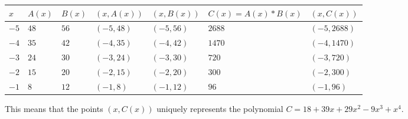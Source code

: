 \documentclass[11pt]{article}
\begin{document}
{\def\LTcaptype{none} %
\begin{longtable}[]{@{}
  >{\raggedright\arraybackslash}p{}
  >{\raggedright\arraybackslash}p{}
  >{\raggedright\arraybackslash}p{}
  >{\raggedright\arraybackslash}p{}
  >{\raggedright\arraybackslash}p{}
  >{\raggedright\arraybackslash}p{}
  >{\raggedright\arraybackslash}p{}@{}}
\toprule\noalign{}
\begin{minipage}[b]{\linewidth}\raggedright
\(x\)
\end{minipage} & \begin{minipage}[b]{\linewidth}\raggedright
\(A(x)\)
\end{minipage} & \begin{minipage}[b]{\linewidth}\raggedright
\(B(x)\)
\end{minipage} & \begin{minipage}[b]{\linewidth}\raggedright
\((x, A(x))\)
\end{minipage} & \begin{minipage}[b]{\linewidth}\raggedright
\((x, B(x))\)
\end{minipage} & \begin{minipage}[b]{\linewidth}\raggedright
\(C(x) = A(x) * B(x)\)
\end{minipage} & \begin{minipage}[b]{\linewidth}\raggedright
\((x, C(x))\)
\end{minipage} \\
\midrule\noalign{}
\endhead
\bottomrule\noalign{}
\endlastfoot
\(-5\) & \(48\) & \(56\) & \((-5, 48)\) & \((-5, 56)\) & \(2688\) &
\((-5, 2688)\) \\
\(-4\) & \(35\) & \(42\) & \((-4, 35)\) & \((-4, 42)\) & \(1470\) &
\((-4, 1470)\) \\
\(-3\) & \(24\) & \(30\) & \((-3, 24)\) & \((-3, 30)\) & \(720\) &
\((-3, 720)\) \\
\(-2\) & \(15\) & \(20\) & \((-2, 15)\) & \((-2, 20)\) & \(300\) &
\((-2, 300)\) \\
\(-1\) & \(8\) & \(12\) & \((-1, 8)\) & \((-1, 12)\) & \(96\) &
\((-1, 96)\) \\
\end{longtable}
}

This means that the points \((x, C(x))\) uniquely represents the
polynomial \(C = 18 + 39x + 29x^2 - 9x^3 + x^4\).
\end{document}
